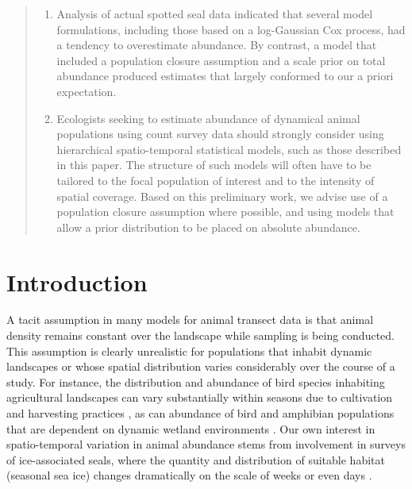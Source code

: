 \documentclass[times,mee,doublespace,]{besauth2}
\begin{document}
\begin{abstract}
\begin{enumerate}
\item Analysis of actual spotted seal data indicated that several model formulations, including those based on a log-Gaussian Cox process, had a tendency to overestimate abundance.  By contrast, a model that included a population closure assumption and a scale prior on total abundance produced estimates that largely conformed to our a priori expectation.
    
\item Ecologists seeking to estimate abundance of dynamical animal populations using count survey data should strongly consider using hierarchical spatio-temporal statistical models, such as those described in this paper. The structure of such models will often have to be tailored to the focal population of interest and to the intensity of spatial coverage.  Based on this preliminary work, we advise use of a population closure assumption where possible, and using models that allow a prior distribution to be placed on absolute abundance.

\end{enumerate}


\end{abstract}


\maketitle \linenumbers

\def\VAR{{\rm Var}\,}
\def\COV{{\rm Cov}\,}
\def\Prob{{\rm P}\,}



\section{Introduction}

A tacit assumption in many models for animal transect data is that animal density remains constant over
the landscape while sampling is being conducted.  This assumption is clearly unrealistic for populations that inhabit dynamic landscapes or whose spatial distribution varies considerably over the course of a study. For instance, the distribution and abundance of bird species inhabiting agricultural landscapes can vary substantially within seasons due to cultivation and harvesting practices \citep{MillerEtAl11jwm}, as can abundance of bird and amphibian populations that are dependent on dynamic wetland environments \citep{MurkinEtAl1997,BabbittTanner2000}.   Our own interest in spatio-temporal variation in animal abundance stems from involvement in surveys of ice-associated seals, where the quantity and distribution of suitable habitat (seasonal sea ice) changes dramatically on the scale of weeks or even days \citep{VerHoefJansen2007,VerHoefEtAl2014}.
\end{document}
